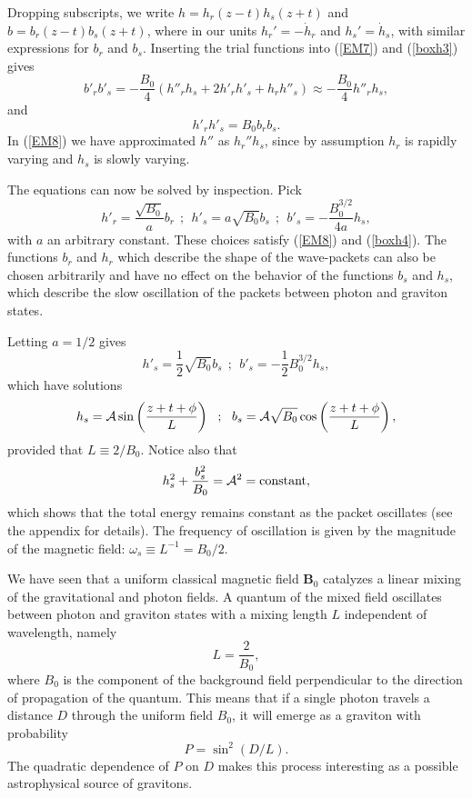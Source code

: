 \documentclass[12pt]{article}
\def\be{\begin{equation}}
\def\ee{\end{equation}}
\begin{document}
Dropping subscripts, we write $h= h_r(z-t)h_s(z+t)$ and $b= b_r(z-t)b_s(z+t)$, where in our units $h_r' = -\dot h_r$ and $h_s' = \dot h_s$, with similar expressions for $b_r$ and $b_s$.  Inserting the trial functions into (\ref{EM7}) and (\ref{boxh3}) gives
\be
b'_rb'_s = -\frac{B_0}{4} (h''_rh_s + 2 h'_rh'_s + h_rh''_s) \approx -\frac{B_0}{4}h''_rh_s,\label{EM8}
\ee
and
\be
h'_rh'_s = B_0b_rb_s\label{boxh4}.
\ee
In  (\ref{EM8}) we have approximated $h''$ as $h_r''h_s$, since by assumption $h_r$ is rapidly varying and $h_s$ is slowly varying.

The equations can now be solved by inspection. Pick
\be\label{hbeq}
h'_r  = \frac{\sqrt{B_0}}{a} b_r\ \ ; \ \ h'_s = a\sqrt{B_0}b_s  \ \ ; \ \ b'_s=-\frac{B_0^{3/2}}{4a}h_s,
\ee
with $a$ an arbitrary constant. These choices satisfy  (\ref{EM8}) and (\ref{boxh4}). The functions $b_r$ and $h_r$ which describe the shape of the wave-packets can also be chosen arbitrarily and have no effect on the behavior of the functions $b_s$ and $h_s$, which describe the slow oscillation of the packets between photon and graviton states. 

Letting $a = 1/2$ gives
\be\label{hbeq2}
h'_s = \frac{1}{2} \sqrt{B_0} b_s  \ \ ; \ \ b'_s = -\frac{1}{2} B_0^{3/2} h_s,
\ee
which have solutions
\be
h_s = {\cal A}\sin\left(\frac{z+t+\phi}{L}\right)\ \  ;\ \ b_s = {\cal A} \sqrt{B_0} \cos\left(\frac{z+t+\phi}{L}\right),
\label{GEsol}
\ee
provided that $L \equiv 2/B_0$. Notice also that 
\be
h_s^2 + \frac{b_s^2}{B_0} ={\cal A}^2=\text{constant}, \label{A2}
\ee
which shows that the total energy remains constant as the packet oscillates (see the appendix for details). The frequency of oscillation is given by the magnitude of the magnetic field: $\omega_s \equiv L^{-1} = B_0/2$.

We have seen that a uniform classical magnetic field $\textbf{B}_0$ catalyzes a linear mixing of the gravitational and photon fields. A quantum of the mixed field oscillates between photon and graviton states with a mixing length $L$ independent of wavelength, namely
\be
L = \frac{2}{B_0} \label{mixingL},
\ee
where $B_0$ is the component of the background field perpendicular to the direction of propagation of the quantum. This means that if a single photon travels a distance $D$ through the uniform field $B_0$, it will emerge as a graviton with probability
\be
P = \sin^2(D/L) \label{prob}.
\ee
The quadratic dependence of $P$ on $D$ makes this process interesting as a possible astrophysical source of gravitons.
\end{document}
